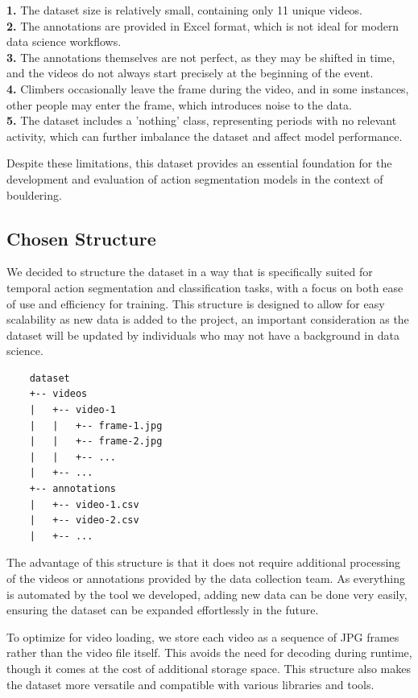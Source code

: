 \textbf{1.} The dataset size is relatively small, containing only 11 unique videos.
\\
\textbf{2.} The annotations are provided in Excel format, which is not ideal for modern data science workflows.
\\
\textbf{3.} The annotations themselves are not perfect, as they may be shifted in time, and the videos do not always start precisely at the beginning of the event.
\\
\textbf{4.} Climbers occasionally leave the frame during the video, and in some instances, other people may enter the frame, which introduces noise to the data.
\\
\textbf{5.} The dataset includes a 'nothing' class, representing periods with no relevant activity, which can further imbalance the dataset and affect model performance.  

Despite these limitations, this dataset provides an essential foundation for the development and evaluation of action segmentation models in the context of bouldering.
\subsection{Chosen Structure}

We decided to structure the dataset in a way that is specifically suited for temporal action segmentation and classification tasks, with a focus on both ease of use and efficiency for training. This structure is designed to allow for easy scalability as new data is added to the project, an important consideration as the dataset will be updated by individuals who may not have a background in data science.

\begin{verbatim}
    dataset
    +-- videos
    |   +-- video-1
    |   |   +-- frame-1.jpg
    |   |   +-- frame-2.jpg
    |   |   +-- ...
    |   +-- ...
    +-- annotations
    |   +-- video-1.csv
    |   +-- video-2.csv
    |   +-- ...
\end{verbatim}

The advantage of this structure is that it does not require additional processing of the videos or annotations provided by the data collection team. As everything is automated by the tool we developed, adding new data can be done very easily, ensuring the dataset can be expanded effortlessly in the future.

To optimize for video loading, we store each video as a sequence of JPG frames rather than the video file itself. This avoids the need for decoding during runtime, though it comes at the cost of additional storage space. This structure also makes the dataset more versatile and compatible with various libraries and tools.

